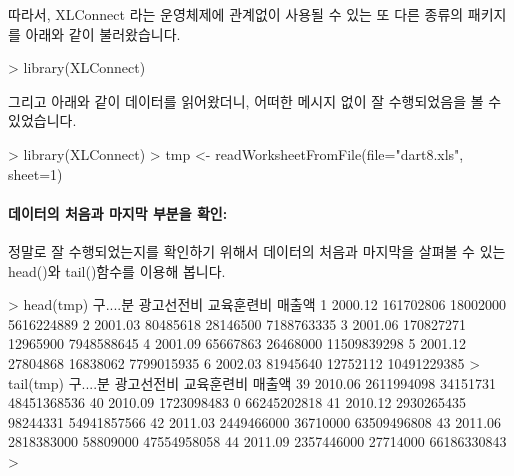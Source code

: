\documentclass[tutorial.tex]{subfiles}
\begin{document}
따라서, XLConnect 라는 운영체제에 관계없이 사용될 수 있는 또 다른 종류의 패키지를 아래와 같이 불러왔습니다.


\begin{Schunk}
\begin{Soutput}
> library(XLConnect)
\end{Soutput}
\end{Schunk}

그리고 아래와 같이 데이터를 읽어왔더니, 어떠한 메시지 없이 잘 수행되었음을 볼 수 있었습니다. 


\begin{Schunk}
\begin{Soutput}
> library(XLConnect)
> tmp <- readWorksheetFromFile(file="dart8.xls", sheet=1)

\end{Soutput}
\end{Schunk}

\paragraph{데이터의 처음과 마지막 부분을 확인:} 
정말로 잘 수행되었는지를 확인하기 위해서 데이터의 처음과 마지막을 살펴볼 수 있는 head()와 tail()함수를 이용해 봅니다.

\begin{Schunk}
\begin{Soutput}
> head(tmp)
  구....분 광고선전비 교육훈련비      매출액
1  2000.12  161702806   18002000  5616224889
2  2001.03   80485618   28146500  7188763335
3  2001.06  170827271   12965900  7948588645
4  2001.09   65667863   26468000 11509839298
5  2001.12   27804868   16838062  7799015935
6  2002.03   81945640   12752112 10491229385
> tail(tmp)
   구....분 광고선전비 교육훈련비      매출액
39  2010.06 2611994098   34151731 48451368536
40  2010.09 1723098483          0 66245202818
41  2010.12 2930265435   98244331 54941857566
42  2011.03 2449466000   36710000 63509496808
43  2011.06 2818383000   58809000 47554958058
44  2011.09 2357446000   27714000 66186330843
> 
\end{Soutput}
\end{Schunk}
\end{document}
